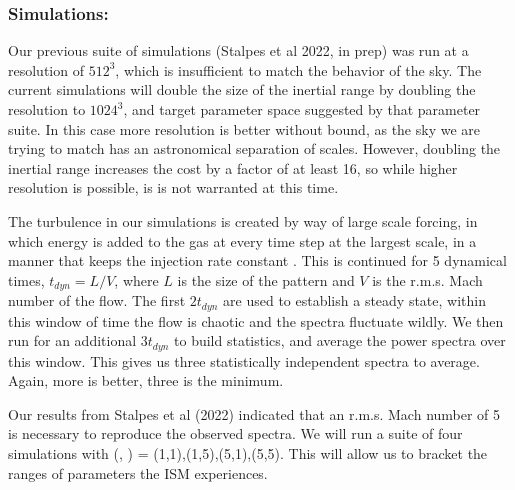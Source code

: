 \subsubsection{Simulations: \nameCMB}
\label{subsec.cmb_sims}

Our previous suite of simulations (Stalpes et al 2022, in prep) was run at a
resolution of  $512^3$, which is insufficient to match the behavior of the sky.
The current simulations will double the size of the inertial range by doubling
the resolution to $1024^3$, and target parameter space suggested by that
parameter suite.  In this case more resolution is better without
bound, as the sky we are trying to match has an astronomical separation of scales. However, doubling
the inertial range increases the cost by a factor of at least 16, so while
higher resolution is possible, is is not warranted at this time.

The turbulence in our simulations is created by way of large scale forcing, in
which energy is added to the gas at every time step at the largest scale, in a
manner that keeps the injection rate constant \citep{MacLow99, Schmidt09}.  This is
continued for 5 dynamical times, $t_{dyn}=L/V$, where $L$ is the size of the
pattern and $V$ is the r.m.s. Mach number of the flow.  The first $2 t_{dyn}$
are used to establish a steady state, within this window of time the flow is
chaotic and the spectra fluctuate wildly.  We then run for an additional $3 t_{dyn}$ to build statistics, and
average the power spectra over this window.  This gives us three statistically
independent spectra to average.  Again, more is better, three is the minimum.  

Our results from Stalpes et al (2022) indicated that an r.m.s. Mach number of 5
is necessary to reproduce the observed spectra.  We will run a suite of four
simulations with (\mach, \alfmach) = (1,1),(1,5),(5,1),(5,5).  This will allow
us to bracket the ranges of parameters the ISM experiences.
